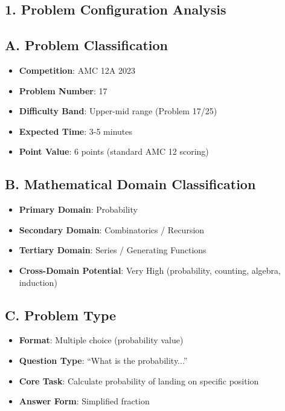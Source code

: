 \documentclass[11pt]{article}
\begin{document}
\begin{problembox}
\section*{1. Problem Configuration Analysis}

\subsection*{A. Problem Classification}
\begin{itemize}[leftmargin=*]
    \item \textbf{Competition}: AMC 12A 2023
    \item \textbf{Problem Number}: 17
    \item \textbf{Difficulty Band}: Upper-mid range (Problem 17/25)
    \item \textbf{Expected Time}: 3-5 minutes
    \item \textbf{Point Value}: 6 points (standard AMC 12 scoring)
\end{itemize}

\subsection*{B. Mathematical Domain Classification}
\begin{itemize}[leftmargin=*]
    \item \textbf{Primary Domain}: Probability
    \item \textbf{Secondary Domain}: Combinatorics / Recursion
    \item \textbf{Tertiary Domain}: Series / Generating Functions
    \item \textbf{Cross-Domain Potential}: Very High (probability, counting, algebra, induction)
\end{itemize}

\subsection*{C. Problem Type}
\begin{itemize}[leftmargin=*]
    \item \textbf{Format}: Multiple choice (probability value)
    \item \textbf{Question Type}: ``What is the probability...''
    \item \textbf{Core Task}: Calculate probability of landing on specific position
    \item \textbf{Answer Form}: Simplified fraction
\end{itemize}


\end{problembox}
\end{document}
